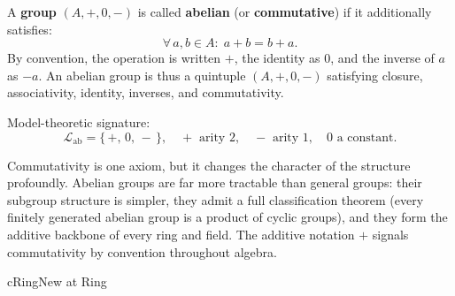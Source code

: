 \begin{definition}
\label{def:formal-model-theoretic-structures-l562}
  A \textbf{group} $(A, +, 0, -)$ is called \textbf{abelian} (or
  \textbf{commutative}) if it additionally satisfies:
  \[
    \forall\,a, b \in A:\; a + b = b + a. \tag{Commutativity}
  \]
  By convention, the operation is written $+$, the identity as $0$, and the
  inverse of $a$ as $-a$.  An abelian group is thus a quintuple $(A, +, 0, -)$
  satisfying closure, associativity, identity, inverses, and commutativity.

  \medskip\noindent
  Model-theoretic signature:
  \[
    \mathcal{L}_{\mathrm{ab}} = \{\,+,\, 0,\, -\,\},
    \quad + \text{ arity } 2,\quad - \text{ arity } 1,\quad
    0 \text{ a constant.}
  \]
\end{definition}

\begin{remark}
  Commutativity is one axiom, but it changes the character of the structure
  profoundly.  Abelian groups are far more tractable than general groups: their
  subgroup structure is simpler, they admit a full classification theorem (every
  finitely generated abelian group is a product of cyclic groups), and they form
  the additive backbone of every ring and field.  The additive notation $+$
  signals commutativity by convention throughout algebra.
\end{remark}



\clearpage\thispagestyle{plain}

\begin{bpnew}{cRing}{New at Ring}
\end{bpnew}

